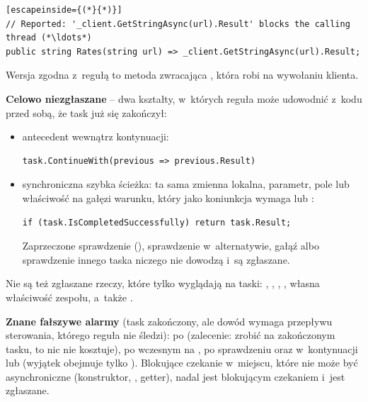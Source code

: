 \begin{lstlisting}[escapeinside={(*}{*)}]
// Reported: '_client.GetStringAsync(url).Result' blocks the calling thread (*\ldots*)
public string Rates(string url) => _client.GetStringAsync(url).Result;
\end{lstlisting}

Wersja zgodna z~regułą to metoda  zwracająca ,
która robi  na wywołaniu klienta.

\textbf{Celowo niezgłaszane} -- dwa kształty, w~których reguła może udowodnić z~kodu przed
sobą, że task już się zakończył:
\begin{itemize}[leftmargin=*]
  \item antecedent wewnątrz kontynuacji:
\begin{lstlisting}
task.ContinueWith(previous => previous.Result)
\end{lstlisting}
  \item synchroniczna szybka ścieżka: ta sama zmienna lokalna, parametr, pole lub właściwość
        na gałęzi  warunku, który jako koniunkcja wymaga
         lub :
\begin{lstlisting}
if (task.IsCompletedSuccessfully) return task.Result;
\end{lstlisting}
        Zaprzeczone
        sprawdzenie (), sprawdzenie w~alternatywie, gałąź
         albo sprawdzenie innego taska niczego nie dowodzą i~są zgłaszane.
\end{itemize}
Nie są też zgłaszane rzeczy, które tylko wyglądają na taski: ,
, ,
, własna właściwość 
zespołu, a~także .

\textbf{Znane fałszywe alarmy} (task zakończony, ale dowód wymaga przepływu sterowania,
którego reguła nie śledzi):  po 
(zalecenie: zrobić  na zakończonym tasku, to nic nie kosztuje), po wczesnym
 na , po sprawdzeniu
 oraz w~kontynuacji
 lub  (wyjątek obejmuje tylko
). Blokujące czekanie w~miejscu, które nie może być asynchroniczne
(konstruktor, , getter), nadal jest blokującym czekaniem i~jest zgłaszane.

